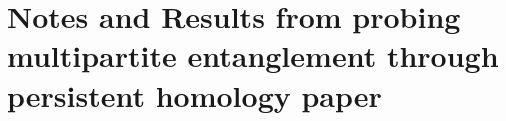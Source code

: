 \section{Notes and Results from probing multipartite entanglement through persistent homology paper}
